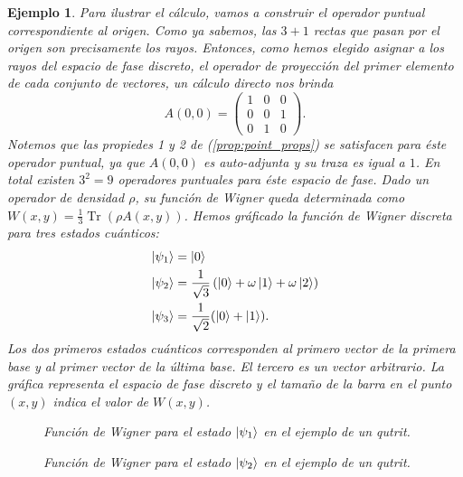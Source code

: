 \documentclass[a4paper]{report}
\DeclareMathOperator{\Tr}{Tr}
\newtheorem{example}{Ejemplo}
\begin{document}
\begin{example}
    Para ilustrar el cálculo, vamos a construir el operador
    puntual correspondiente al origen. Como ya sabemos, las
    $3+1$ rectas que pasan por el origen son precisamente
    los rayos. Entonces, como hemos elegido asignar a los
    rayos del espacio de fase discreto, el operador de
    proyección del primer elemento de cada conjunto de
    vectores, un cálculo directo nos brinda
    \begin{equation}
      A(0,0)
      = \begin{pmatrix}
        1 & 0 & 0 \\
        0 & 0 & 1 \\
        0 & 1 & 0
      \end{pmatrix}. 
    \end{equation}
    Notemos que las propiedes 1 y 2 de
    (\ref{prop:point_props}) se satisfacen para éste
    operador puntual, ya que $A(0,0)$ es auto-adjunta y su
    traza es igual a $1$. En total existen $3^2 = 9$
    operadores puntuales para éste espacio de fase. Dado un
    operador de densidad $\rho$, su función de Wigner queda
    determinada como $W(x,y) = \frac{1}{3} \Tr(\rho
    A(x,y))$. Hemos gráficado la función de Wigner discreta
    para tres estados cuánticos:
    \begin{align}
      \ket{\psi_1}
      &= \ket 0 \\ 
      \ket{\psi_2}
      &= \frac{1}{\sqrt{3}}
      \left(
        \ket 0 + \omega \ket 1 + \omega \ket 2
      \right) \\
      \ket{\psi_3}
      &= \frac{1}{\sqrt{2}} (\ket 0 + \ket 1).
    \end{align}
    Los dos primeros estados cuánticos corresponden al
    primero vector de la primera base y al primer vector de
    la última base. El tercero es un vector arbitrario. La
    gráfica representa el espacio de fase discreto y el
    tamaño de la barra en el punto $(x,y)$ indica el valor
    de $W(x,y)$.

    \begin{figure}[ht]
      \centering
      \scalebox{0.7}{
        
      }
      \caption{Función de Wigner para el estado
        $\ket{\psi_1}$ en el ejemplo de un qutrit.}
      \label{fig:wigner-desargues-3-1-s1}
    \end{figure}

    \begin{figure}[ht]
      \centering
      \scalebox{0.7}{
        
      }
      \caption{Función de Wigner para el estado
        $\ket{\psi_2}$ en el ejemplo de un qutrit.}
      \label{fig:wigner-desargues-3-1-s2}
    \end{figure}
    

\end{example}
\end{document}
